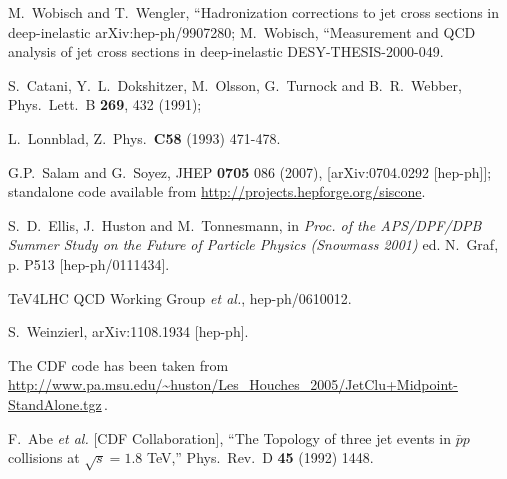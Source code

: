 \documentclass[12pt,a4]{article}
\begin{document}
\begin{thebibliography}{99}
  M.~Wobisch and T.~Wengler,
   ``Hadronization corrections to jet cross sections in deep-inelastic
  arXiv:hep-ph/9907280;
  M.~Wobisch,
   ``Measurement and QCD analysis of jet cross sections in deep-inelastic
DESY-THESIS-2000-049.

  S.~Catani, Y.~L.~Dokshitzer, M.~Olsson, G.~Turnock and B.~R.~Webber,
  Phys.\ Lett.\ B {\bf 269}, 432 (1991);

  L.~Lonnblad,
  Z.\ Phys.\  {\bf C58 } (1993)  471-478.


  G.P.~Salam and G.~Soyez,
  JHEP {\bf 0705} 086 (2007),
  [arXiv:0704.0292 [hep-ph]]; 
standalone code available from \url{http://projects.hepforge.org/siscone}.


  S.~D.~Ellis, J.~Huston and M.~Tonnesmann,
in {\it Proc. of the APS/DPF/DPB Summer Study on the Future of
  Particle Physics (Snowmass 2001) } ed. N.~Graf, p. P513
  [hep-ph/0111434].

  TeV4LHC QCD Working Group {\it et al.},
  hep-ph/0610012.

  S.~Weinzierl,
  arXiv:1108.1934 [hep-ph].


 The CDF code has been taken from \\
  \url{http://www.pa.msu.edu/~huston/Les_Houches_2005/JetClu+Midpoint-StandAlone.tgz}\,.

  F.~Abe {\it et al.}  [CDF Collaboration],
  ``The Topology of three jet events in $\bar{p}p$ collisions at $\sqrt{s} =
  1.8$ TeV,''
  Phys.\ Rev.\ D {\bf 45} (1992) 1448.


\end{thebibliography}
\end{document}
